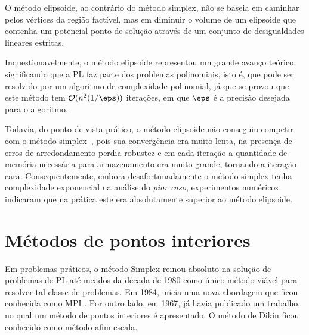 O  método elipsoide, ao contrário do método simplex,  não se baseia em caminhar pelos
vértices da região factível, mas em diminuir o volume de um elipsoide que
contenha um potencial ponto de solução através de um conjunto de desigualdades
lineares estritas.

Inquestionavelmente, o método elipsoide representou um grande avanço teórico,
significando que a \acl{PL} faz parte dos problemas polinomiais, isto é, que
pode ser resolvido por um algoritmo de complexidade polinomial, já que se provou
que este método tem $\mathcal{O}(n^2(1/\eps))$ iterações, em
que $\eps$ é a precisão desejada para o algoritmo.

Todavia, do ponto de vista prático, o método elipsoide não conseguiu competir com o
método simplex~\cite{Bland:1981vn}, pois sua convergência era muito lenta, na
presença de erros de arredondamento perdia robustez e em cada iteração a
quantidade de memória necessária para armazenamento era muito grande, tornando a iteração cara.
Consequentemente, embora desafortunadamente o método simplex tenha complexidade
exponencial na análise do \emph{pior caso}, experimentos numéricos indicaram que
na prática este era absolutamente superior ao método elipsoide.


\section{Métodos de pontos interiores}



Em problemas práticos, o método Simplex reinou absoluto na solução de problemas
de \ac{PL} até meados da década de 1980 como único método viável para resolver
tal classe de problemas. Em 1984, \textcite{Karmarkar:1984cp} inicia uma nova
abordagem que ficou conhecida como
\acf{MPI} . Por outro lado,  em 1967,
\textcite{DIKIN:InterativeSol1967} já havia publicado um trabalho, no qual  
 um método de pontos interiores é apresentado. O método de Dikin ficou
conhecido como método afim-escala.
      



